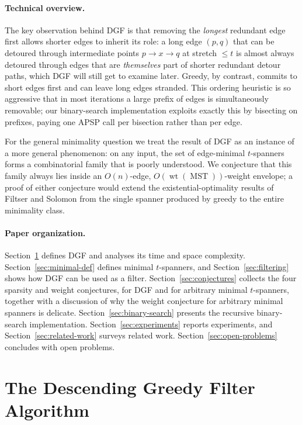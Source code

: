 \documentclass{article}
\DeclareMathOperator{\wt}{wt}
\DeclareMathOperator{\MST}{MST}
\begin{document}
\paragraph{Technical overview.}
The key observation behind DGF is that removing the \emph{longest}
redundant edge first allows shorter edges to inherit its role: a long
edge $(p,q)$ that can be detoured through intermediate points
$p\!\to\!x\!\to\!q$ at stretch $\le t$ is almost always detoured
through edges that are \emph{themselves} part of shorter redundant
detour paths, which DGF will still get to examine later. Greedy, by
contrast, commits to short edges first and can leave long edges
stranded. This ordering heuristic is so aggressive that in most
iterations a large prefix of edges is simultaneously removable; our
binary-search implementation exploits exactly this by bisecting on
prefixes, paying one APSP call per bisection rather than per edge.

For the general minimality question we treat the result of DGF as an
instance of a more general phenomenon: on any input, the set of
edge-minimal $t$-spanners forms a combinatorial family that is poorly
understood. We conjecture that this family always lies inside an
$O(n)$-edge, $O(\wt(\MST))$-weight envelope; a proof of either
conjecture would extend the existential-optimality results of Filtser
and Solomon from the single spanner produced by greedy to the entire
minimality class.

\paragraph{Paper organization.}
Section~\ref{sec:algorithm} defines DGF and analyses its time and space
complexity. Section~\ref{sec:minimal-def} defines minimal
$t$-spanners, and Section~\ref{sec:filtering} shows how DGF can be
used as a filter. Section~\ref{sec:conjectures} collects the four
sparsity and weight conjectures, for DGF and for arbitrary minimal
$t$-spanners, together with a discussion of why the weight conjecture
for arbitrary minimal spanners is delicate.
Section~\ref{sec:binary-search} presents the recursive binary-search
implementation. Section~\ref{sec:experiments} reports experiments,
and Section~\ref{sec:related-work} surveys related work.
Section~\ref{sec:open-problems} concludes with open problems.

\newpage

\section{The Descending Greedy Filter Algorithm}
\label{sec:algorithm}
\end{document}
